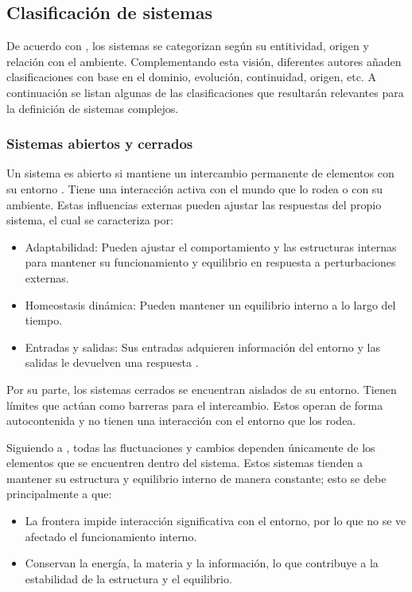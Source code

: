 \subsection{Clasificación de sistemas}

De acuerdo con \cite{Arnold1998_def_tgs}, los sistemas se categorizan según su entitividad, origen y relación con el ambiente. Complementando esta visión, diferentes autores añaden clasificaciones con base en el dominio, evolución, continuidad, origen, etc. A continuación se listan algunas de las clasificaciones que resultarán relevantes para la definición de sistemas complejos.

\subsubsection{Sistemas abiertos y cerrados}

Un sistema es abierto si mantiene un intercambio permanente de elementos con su entorno \cite{Arnold1998_def_tgs}. Tiene una interacción activa con el mundo que lo rodea o con su ambiente. Estas influencias externas pueden ajustar las respuestas del propio sistema, el cual se caracteriza por:

\begin{itemize}
	\item Adaptabilidad: Pueden ajustar el comportamiento y las estructuras internas para mantener su funcionamiento y equilibrio en respuesta a perturbaciones externas.
	\item Homeostasis dinámica: Pueden mantener un equilibrio interno a lo largo del tiempo.
	\item Entradas y salidas: Sus entradas adquieren información del entorno y las salidas le devuelven una respuesta \cite{Ospina2023_abierto}.
\end{itemize}

Por su parte, los sistemas cerrados se encuentran aislados de su entorno. Tienen límites que actúan como barreras para el intercambio. Estos operan de forma autocontenida y no tienen una interacción con el entorno que los rodea.

Siguiendo a \cite{Ospina2023_abierto}, todas las fluctuaciones y cambios dependen únicamente de los elementos que se encuentren dentro del sistema. Estos sistemas tienden a mantener su estructura y equilibrio interno de manera constante; esto se debe principalmente a que:

\begin{itemize}
	\item La frontera impide interacción significativa con el entorno, por lo que no se ve afectado el funcionamiento interno.
	
	\item Conservan la energía, la materia y la información, lo que contribuye a la estabilidad de la estructura y el equilibrio.	
\end{itemize}

